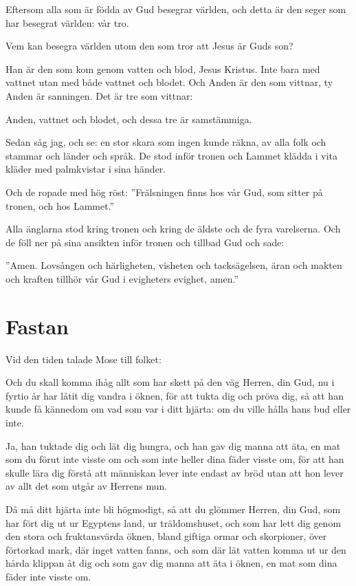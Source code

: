 {Eftersom alla som är födda av Gud besegrar världen, och detta är den seger som har besegrat världen: vår tro.}

Vem kan besegra världen utom den som tror att Jesus är Guds son?
 
Han är den som kom genom vatten och blod, Jesus Kristus. Inte bara med vattnet utan med både vattnet och blodet. Och Anden är den som vittnar, ty Anden är sanningen.
Det är tre som vittnar:

Anden, vattnet och blodet, och dessa tre är samstämmiga.

{Sedan såg jag, och se: en stor skara som ingen kunde räkna, av alla folk och stammar och länder och språk.} De stod inför tronen och Lammet klädda i vita kläder med palmkvistar i sina händer.

Och de ropade med hög röst: ''Frälsningen finns hos vår Gud, som sitter på tronen, och hos Lammet.''

Alla änglarna stod kring tronen och kring de äldste och de fyra varelserna. Och de föll ner på sina ansikten inför tronen och tillbad Gud
och sade: 

''Amen. Lovsången och härligheten, visheten och tacksägelsen, äran och makten och kraften tillhör vår Gud i evigheters evighet, amen.''

\newpage
\section{Fastan}

{Vid den tiden talade Mose till folket:}

Och du skall komma ihåg allt som har skett på den väg Herren, din Gud, nu i fyrtio år har låtit dig vandra i öknen, för att tukta dig och pröva dig, så att han kunde få kännedom om vad som var i ditt hjärta: om du ville hålla hans bud eller inte. 

Ja, han tuktade dig och lät dig hungra, och han gav dig manna att äta, en mat som du förut inte visste om och som inte heller dina fäder visste om, för att han skulle lära dig förstå att människan lever inte endast av bröd utan att hon lever av allt det som utgår av Herrens mun. 

Då må ditt hjärta inte bli högmodigt, så att du glömmer Herren, din Gud, som har fört dig ut ur Egyptens land, ur träldomshuset, och som har lett dig genom den stora och fruktansvärda öknen, bland giftiga ormar och skorpioner, över förtorkad mark, där inget vatten fanns, och som där lät vatten komma ut ur den hårda klippan åt dig och som gav dig manna att äta i öknen, en mat som dina fäder inte visste om.

